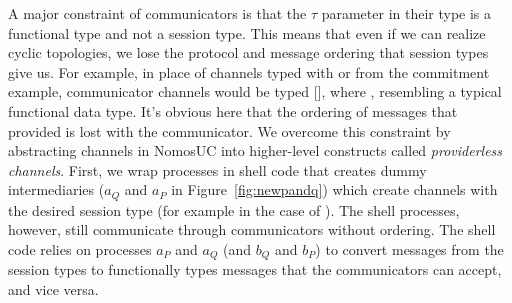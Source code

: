 

A major constraint of communicators is that the $\tau$ parameter in their type is a functional type
and not a session type. This means that even if we can realize cyclic topologies, we lose the protocol and message ordering
that session types give us. 
For example, in place of channels typed with  or  from the commitment example, communicator channels would be typed [], where 
,
resembling a typical functional data type.
It's obvious here that the ordering of messages that  provided is lost with the communicator.
We overcome this constraint by abstracting channels in NomosUC into higher-level constructs called \emph{providerless channels}.
First, we wrap processes in shell code that creates dummy intermediaries ($a_Q$ and $a_P$ in Figure~\ref{fig:newpandq}) which
create channels with the desired session type (for example  in the case of \Fcom). The shell processes, however, still communicate through communicators without ordering. 
The shell code relies on processes $a_P$ and $a_Q$ (and $b_Q$ and $b_P$) to convert messages from the session types to 
functionally types messages that the communicators can accept, and vice versa.

